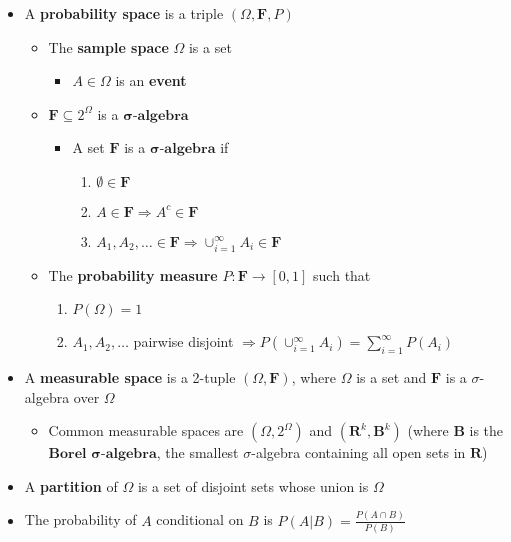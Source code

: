 \documentclass[12pt,english]{article}
\begin{document}
\begin{itemize}
	\item A \textbf{probability space} is a triple $(\Omega, \mathbf{F}, P)$
	\begin{itemize}
		\item The \textbf{sample space} $\Omega$ is a set
		\begin{itemize}
			\item $A \in \Omega$ is an \textbf{event}
		\end{itemize}
		\item $\mathbf{F} \subseteq 2^{\Omega}$ is a $\mathbf{\sigma}\textbf{-algebra}$
		\begin{itemize}
			\item A set $\mathbf{F}$ is a $\mathbf{\sigma}\textbf{-algebra}$ if
			\begin{enumerate}
				\item $\emptyset \in \mathbf{F}$
				\item $A \in \mathbf{F} \Rightarrow A^{c} \in \mathbf{F}$
				\item $A_{1}, A_{2}, \ldots \in \mathbf{F} \Rightarrow \cup_{i=1}^{\infty} A_{i} \in \mathbf{F}$
			\end{enumerate}
		\end{itemize}
		\item The \textbf{probability measure} $P : \mathbf{F} \to [0,1]$ such that
		\begin{enumerate}
			\item $P(\Omega) = 1$
			\item $A_{1}, A_{2}, \ldots$ pairwise disjoint $\Rightarrow P(\cup_{i = 1}^{\infty} A_{i}) = \sum_{i = 1}^{\infty} P(A_{i})$
		\end{enumerate}
	\end{itemize}
	\item A \textbf{measurable space} is a 2-tuple $(\Omega, \mathbf{F})$, where $\Omega$ is a set and $\mathbf{F}$ is a $\sigma$-algebra over $\Omega$
	\begin{itemize}
		\item Common measurable spaces are $(\Omega, 2^{\Omega})$ and $(\mathbf{R}^{k}, \mathbf{B}^{k})$ (where $\mathbf{B}$ is the $\textbf{Borel }\mathbf{\sigma}\textbf{-algebra}$, the smallest $\sigma$-algebra containing all open sets in $\mathbf{R}$)
	\end{itemize}
	\item A \textbf{partition} of $\Omega$ is a set of disjoint sets whose union is $\Omega$
	\item The probability of $A$ conditional on $B$ is $P(A | B) = \frac{P(A \cap B)}{P(B)}$

\end{itemize}
\end{document}
